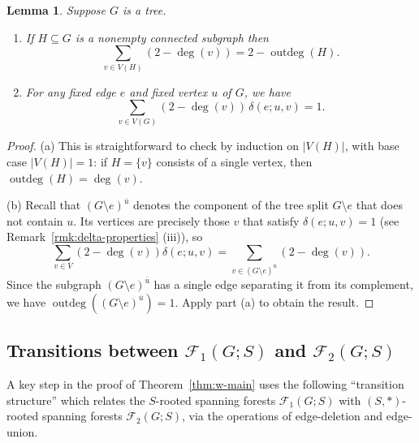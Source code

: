 \documentclass[12pt]{amsart}
\newtheorem{lem}[thm]{Lemma}
\theoremstyle{definition}
\newcommand{\trees}{\mathcal{F}_1}
\newcommand{\forests}{\mathcal{F}}
\DeclareMathOperator{\outdeg}{outdeg}
\begin{document}
\begin{lem}
\label{lem:outdeg-sum}
Suppose $G$ is a tree.
\begin{enumerate}[label=(\alph*)]
\item
If $H \subseteq G$ is a nonempty connected subgraph then
\[
	\sum_{v \in V(H)} \left( 2 -  \deg(v) \right) = 2 - \outdeg(H) .
\]
\item 
For any fixed edge $e$ and fixed vertex $u$ of $G$, we have
\[
	\sum_{v \in V(G)} (2 - \deg(v))\, \delta(e; u,v) = 1.
\]
\end{enumerate}
\end{lem}
\begin{proof}
(a)
This is straightforward to check by induction on $|V(H)|$,
with base case $|V(H)| = 1$:
if $H = \{v\}$ consists of a single vertex, then $\outdeg(H) = \deg(v)$.


(b)
Recall that $(G \setminus e)^{\overline u}$ denotes the component of the tree split $G \setminus e$ that does not contain $u$.
Its vertices are precisely those $v$ that satisfy $\delta(e; u, v) = 1$ (see Remark~\ref{rmk:delta-properties} (iii)), so
\[
	\sum_{v \in V} (2 - \deg(v)) \delta(e; u,v)
	= \sum_{v \in (G \setminus e)^{\overline u}} (2 - \deg(v)) .
\] 
Since the subgraph $(G \setminus e)^{\overline u}$ has a single edge separating it from its complement, we have
$\outdeg((G \setminus e)^{\overline u}) = 1$.
Apply part (a) to obtain the result.
\end{proof}


\subsection{Transitions between $\trees(G; S)$ and $\forests_2(G; S)$}
A key step in the proof of Theorem~\ref{thm:w-main} uses the following ``transition structure'' which relates the $S$-rooted spanning forests $\trees(G; S)$ with $(S, *)$-rooted spanning forests $\forests_2(G; S)$,
via the operations of edge-deletion and edge-union.
\end{document}

